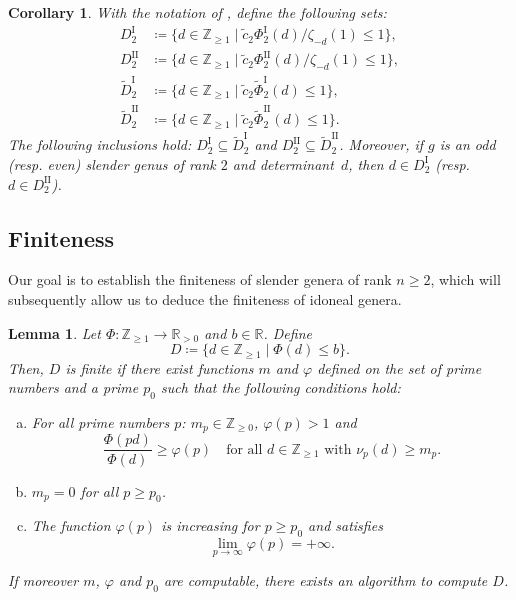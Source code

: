 \documentclass[a4paper]{amsart}
\theoremstyle{definition}
\theoremstyle{plain}
\newtheorem{lemma}[definition]{Lemma}
\newtheorem{corollary}[definition]{Corollary}
\newcommand{\IR}{\mathbb{R}}
\newcommand{\IZ}{\mathbb{Z}}
\newcommand{\I}{\mathrm{I}}
\newcommand{\II}{\mathrm{II}}
\begin{document}
\begin{corollary} \label{cor:DI2}
With the notation of , define the following sets: 
\begin{align*}
    D_2^\I & \coloneqq \{d \in \IZ_{\geq 1} \mid \tilde{c}_2\Phi_2^\I(d)/\zeta_{-d}(1)\leq 1\},\\
    D_2^\II & \coloneqq \{d \in \IZ_{\geq 1} \mid \tilde{c}_2 \Phi_2^\II(d)/\zeta_{-d}(1)\leq 1\}, \\
    \tilde D_2^\I & \coloneqq \{d \in \IZ_{\geq 1} \mid \tilde{c}_2 \tilde{\Phi}_2^\I(d) \leq 1\}, \\
    \tilde D_2^\II & \coloneqq \{d \in \IZ_{\geq 1} \mid \tilde{c}_2 \tilde{\Phi}_2^\II(d) \leq 1\}.
\end{align*}
The following inclusions hold: \(D_2^\I \subseteq \tilde{D}_2^\I\) and \(D_2^\II \subseteq \tilde{D}_2^\II\).
Moreover, if \(g\) is an odd (resp. even) slender genus of rank \(2\) and determinant~\(d\), then \(d \in D^\I_2\) (resp. \(d \in D^\II_2\)).
\end{corollary}



\subsection{Finiteness} \label{subsec:finiteness}
Our goal is to establish the finiteness of slender genera of rank \(n \geq 2\), which will subsequently allow us to deduce the finiteness of idoneal genera.

\begin{lemma} \label{lem:Phi_new}
Let \(\Phi \colon \mathbb{Z}_{\geq 1} \to \mathbb{R}_{>0}\) and \(b \in \IR\). Define
\[
    D \coloneqq \{d \in \mathbb{Z}_{\geq 1} \mid \Phi(d) \leq b\}.
\]
Then, \(D\) is finite if there exist functions $m$ and $\varphi$ defined on the set of prime numbers and a prime $p_0$ such that the following conditions hold: 
\begin{enumerate}[(a)]
    \item \label{cond:Phi_(a)} For all prime numbers \(p\): \(m_p \in \IZ_{\geq 0}\), $\varphi(p)>1$ and
    \[
        \frac{\Phi(pd)}{\Phi(d)} \geq \varphi(p) \quad \text{for all \(d \in \mathbb{Z}_{\geq 1}\) with \(\nu_p(d) \geq m_p\)}.
    \]
    \item \label{cond:Phi_(b)} \(m_p = 0\) for all \(p \geq p_0\).
    \item \label{cond:Phi_(c)} The function \(\varphi(p)\) is increasing for \(p \geq p_0\) and satisfies
    \[
        \lim_{p \to \infty} \varphi(p) = +\infty.
    \]
\end{enumerate}
If moreover $m$, $\varphi$ and $p_0$ are computable, there exists an algorithm to compute \(D\).
\end{lemma}
\end{document}
